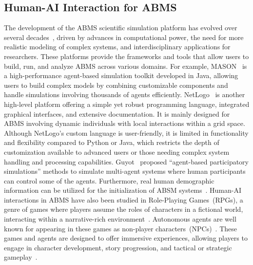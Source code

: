 \subsection{Human-AI Interaction for ABMS}
The development of the ABMS scientific simulation platform has evolved over several decades~\cite{doi:10.1177/0037549706073695,berryman2008review}, driven by advances in computational power, the need for more realistic modeling of complex systems, and interdisciplinary applications for researchers. 
These platforms provide the frameworks and tools that allow users to build, run, and analyze ABMS across various domains.
For example, MASON~\cite{doi:10.1177/0037549705058073} is a high-performance agent-based simulation toolkit developed in Java, allowing users to build complex models by combining customizable components and handle simulations involving thousands of agents efficiently.
NetLogo~\cite{netlogo} is another high-level platform offering a simple yet robust programming language, integrated graphical interfaces, and extensive documentation.
It is mainly designed for ABMS involving dynamic individuals with local interactions within a grid space.
Although NetLogo’s custom language is user-friendly, it is limited in functionality and flexibility compared to Python or Java, which restricts the depth of customization available to advanced users or those needing complex system handling and processing capabilities.
Guyot\etal~\cite{guyot2006} proposed ``agent-based participatory simulations'' methods to simulate multi-agent systems where human participants can control some of the agents.
Furthermore, real human demographic information can be utilized for the initialization of ABSM systems~\cite{GAUBE201392,10.1145/3394486.3412862}.
Human-AI interactions in ABMS have also been studied in Role-Playing Games~(RPGs), a genre of games where players assume the roles of characters in a fictional world, interacting within a narrative-rich environment~\cite{riedl_interactive_2021}.
Autonomous agents are well known for appearing in these games as non-player characters~(NPCs)~\cite{10.1145/2282338.2282384,10.1145/2159365.2159425}.
These games and agents are designed to offer immersive experiences, allowing players to engage in character development, story progression, and tactical or strategic gameplay~\cite{brenner_creating_2010,isbister_consistency_2000}.

